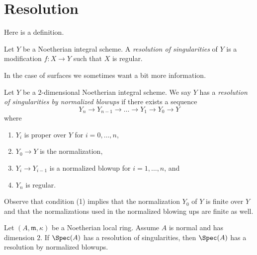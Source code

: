 










\section{Resolution}
\label{section-resolution}



\noindent
Here is a definition.

\begin{definition}
\label{definition-resolution}
Let $Y$ be a Noetherian integral scheme. A {\it resolution of singularities}
of $Y$ is a modification $f : X \to Y$ such that $X$ is regular.
\end{definition}

\noindent
In the case of surfaces we sometimes want a bit more information.

\begin{definition}
\label{definition-resolution-surface}
Let $Y$ be a $2$-dimensional Noetherian integral scheme.
We say $Y$ has a {\it resolution of singularities by normalized blowups}
if there exists a sequence
$$
Y_n \to Y_{n - 1} \to \ldots \to Y_1 \to Y_0 \to Y
$$
where
\begin{enumerate}
\item $Y_i$ is proper over $Y$ for $i = 0, \ldots, n$,
\item $Y_0 \to Y$ is the normalization,
\item $Y_i \to Y_{i - 1}$ is a normalized blowup for $i = 1, \ldots, n$, and
\item $Y_n$ is regular.
\end{enumerate}
\end{definition}

\noindent
Observe that condition (1) implies that the normalization
$Y_0$ of $Y$ is finite over $Y$ and that the normalizations
used in the normalized blowing ups are finite as well.

\begin{lemma}
\label{lemma-existence-implies-existence-by-normalized-blowing-ups}
Let $(A, \mathfrak m, \kappa)$ be a Noetherian local ring.
Assume $A$ is normal and has dimension $2$.
If $\Spec(A)$ has a resolution of singularities,
then $\Spec(A)$ has a resolution by normalized blowups.
\end{lemma}

